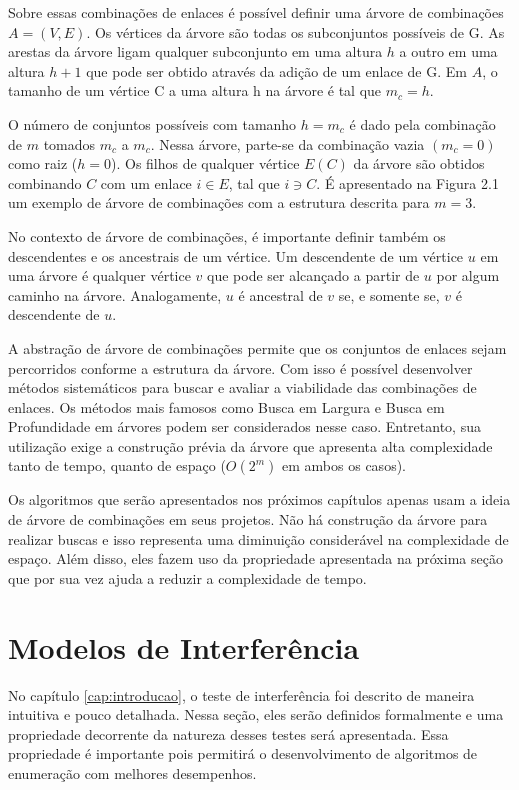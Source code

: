 Sobre essas combinações de enlaces é possível definir uma árvore de combinações $A=(V,E)$. Os vértices da árvore são todas os subconjuntos possíveis de G. As arestas da árvore ligam qualquer subconjunto em uma altura $h$ a outro em uma altura $h+1$ que pode ser obtido através da adição de um enlace de G. Em $A$, o tamanho de um vértice C a uma altura h na árvore é tal que $m_c=h$.

O número de conjuntos possíveis com tamanho $h=m_c$ é dado pela combinação de $m$ tomados $m_c$ a $m_c$. Nessa árvore, parte-se da combinação vazia $(m_{c}=0)$ como raiz ($h=0$). Os filhos de qualquer vértice $E(C)$ da árvore são obtidos combinando $C$ com um enlace $i \in E$, tal que $i \ni C$. É apresentado na Figura 2.1 um exemplo de árvore de combinações com a estrutura descrita para $m=3$.




No contexto de árvore de combinações, é importante definir também os descendentes e os ancestrais de um vértice. Um descendente de um vértice $u$ em uma árvore é qualquer vértice $v$ que pode ser alcançado a partir de $u$ por algum caminho na árvore. Analogamente, $u$ é ancestral de $v$ se, e somente se, $v$ é descendente de $u$. 

A abstração de árvore de combinações permite que os conjuntos de enlaces sejam percorridos conforme a estrutura da árvore. Com isso é possível desenvolver métodos sistemáticos para buscar e avaliar a viabilidade das combinações de enlaces. Os métodos mais famosos como Busca em Largura e Busca em Profundidade em árvores podem ser considerados nesse caso. Entretanto, sua utilização exige a construção prévia da árvore que apresenta alta complexidade tanto de tempo, quanto de espaço ($O(2^m)$ em ambos os casos).

Os algoritmos que serão apresentados nos próximos capítulos apenas usam a ideia de árvore de combinações em seus projetos. Não há construção da árvore para realizar buscas e isso representa uma diminuição considerável na complexidade de espaço. Além disso, eles fazem uso da propriedade apresentada na próxima seção que por sua vez ajuda a reduzir a complexidade de tempo.

\section{Modelos de Interferência}

No capítulo \ref{cap:introducao}, o teste de interferência foi descrito de maneira intuitiva e pouco detalhada. Nessa seção, eles serão definidos formalmente e uma propriedade decorrente da natureza desses testes será apresentada. Essa propriedade é importante pois permitirá o desenvolvimento de algoritmos de enumeração com melhores desempenhos.

